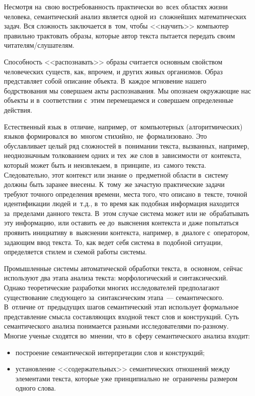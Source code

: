 \documentclass[12pt]{article}
\theoremstyle{definition}
\theoremstyle{remark}
\numberwithin{equation}{section}
\begin{document}
Несмотря на~свою востребованность практически во~всех областях жизни
человека, семантический анализ является одной из~сложнейших математических
задач. Вся сложность заключается в~том, чтобы <<научить>> компьютер
правильно трактовать образы, которые автор текста пытается передать
своим читателям/слушателям.

Способность <<распознавать>> образы считается основным свойством
человеческих существ, как, впрочем, и других живых организмов.
Образ представляет собой описание объекта. В~каждое мгновение
нашего бодрствования мы совершаем акты распознавания. Мы опознаем
окружающие нас объекты и в~соответствии с~этим перемещаемся и
совершаем определенные действия.

Естественный язык в~отличие, например, от~компьютерных (алгоритмических)
языков формировался во~многом стихийно, не~формализовано. Это
обуславливает целый ряд сложностей в~понимании текста, вызванных,
например, неоднозначным толкованием одних и тех~же слов в~зависимости
от~контекста, который может быть и неизвлекаем, в~принципе, из~самого
текста. Следовательно, этот контекст или знание о~предметной области
в~систему должны быть заранее внесены. К~тому~же зачастую практические
задачи требуют точного определения времени, места того, что описано
в~тексте, точной идентификации людей и~т.д., в~то время как подобная
информация находится за~пределами данного текста. В~этом случае система
может или не~обрабатывать эту информацию, или оставить ее до~выяснения
контекста и даже попытаться проявить инициативу в~выяснении контекста,
например, в~диалоге с~оператором, задающим ввод текста. То, как ведет
себя система в~подобной ситуации, определяется стилем и схемой работы
системы.

Промышленные системы автоматической обработки текста, в~основном, сейчас
используют два этапа анализа текста: морфологический и синтаксический.
Однако теоретические разработки многих исследователей предполагают
существование следующего за~синтаксическим этапа~--- семантического.
В~отличие от~предыдущих шагов семантический этап использует формальное
представление смысла составляющих входной текст слов и конструкций.
Суть семантического анализа понимается разными исследователями по-разному.
Многие ученые сходятся во~мнении, что в~сферу семантического анализа входит:
\begin{itemize}
    \item построение семантической интерпретации слов и конструкций;
    \item установление <<содержательных>> семантических отношений
    между элементами текста, которые уже принципиально не~ограничены
    размером одного слова.
\end{itemize}
\end{document}

